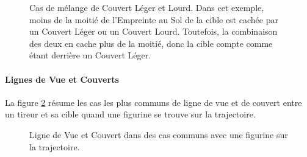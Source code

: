 \newcommand{\figureSHCSizeLarge}{\normalfontsize{Grande Taille}}
\newcommand{\figureSHCSizeStandard}{\normalfontsize{Taille Standard}}
\newcommand{\figureSHCLessthanhalffromhardcover}{\normalfontsize{\textit{Moins de 50 \% en Couvert Lourd}}}
\newcommand{\figureSHCLessthanhalffromsoftcover}{\normalfontsize{\textit{Moins de 50 \% en Couvert Léger}}}
\newcommand{\figureSHCMorethanhalftotal}{\normalfontsize{\textit{Plus de 50 \% en tout}}}

\begin{figure}[!htbp]
\begin{minipage}[t]{0.55\textwidth}
\def\svgwidth{\textwidth}

\end{minipage}\hfill\begin{minipage}[b]{0.42\textwidth}
\caption{Cas de mélange de Couvert Léger et Lourd.\vspace*{10pt}\newline
Dans cet exemple, moins de la moitié de l'Empreinte au Sol de la cible est cachée par un Couvert Léger ou un Couvert Lourd. Toutefois, la combinaison des deux en cache plus de la moitié, donc la cible compte comme étant derrière un Couvert Léger.}
\label{figure/soft_and_hard_cover}
\end{minipage}
\end{figure}

\clearpage
\paragraph{Lignes de Vue et Couverts}

La figure \ref{figure/line_of_sight_and_cover} résume les cas les plus communs de ligne de vue et de couvert entre un tireur et sa cible quand une figurine se trouve sur la trajectoire.

\newcommand{\figureLoSCSoftcover}{\Largefontsize{Couvert Léger (-1)}}
\newcommand{\figureLoSCHardcover}{\Largefontsize{Couvert Lourd (-2)}}
\newcommand{\figureLoSCNocover}{\Largefontsize{Pas de Couvert}}
\newcommand{\figureLoSCNolineofsight}{\Largefontsize{Pas de Ligne de Vue}}
\newcommand{\figureLoSCSmall}{Standard}
\newcommand{\figureLoSCMedium}{Grande}
\newcommand{\figureLoSCLarge}{Gigantesque}

\begin{figure}[!htbp]
\centering
\def\svgwidth{12cm}

\caption{Ligne de Vue et Couvert dans des cas communs avec une figurine sur la trajectoire.}
\label{figure/line_of_sight_and_cover}
\end{figure}

